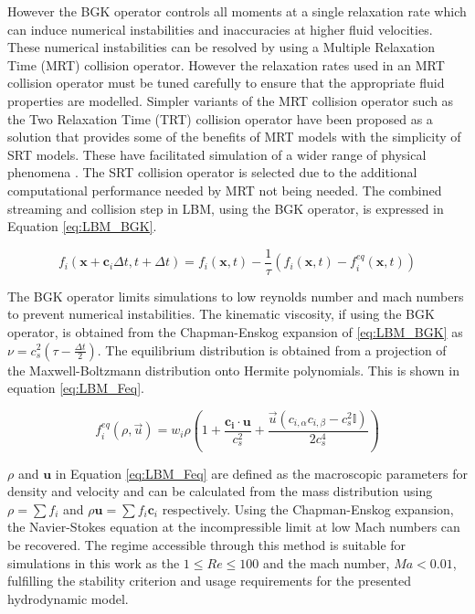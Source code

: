 However the BGK operator controls all moments at a single relaxation rate which can induce numerical instabilities and inaccuracies
at higher fluid velocities. \cite{liu_simulation_2023, adhikari_fluctuating_2005} These numerical instabilities can be resolved by using
a Multiple Relaxation Time (MRT) collision operator. However the relaxation rates used in an MRT collision operator must be tuned carefully
to ensure that the appropriate fluid properties are modelled. Simpler variants of the MRT collision operator such as the Two Relaxation Time (TRT)
collision operator have been proposed as a solution that provides some of the benefits of MRT models with the simplicity of SRT models. These 
have facilitated simulation of a wider range of physical phenomena \cite{adhikari_fluctuating_2005, liu_simulation_2023}. The SRT collision 
operator is selected due to the additional computational performance needed by MRT not being needed. The combined streaming and 
collision step in LBM, using the BGK operator, is expressed in Equation \ref{eq:LBM_BGK}.

\begin{equation}
    f_{i}(\mathbf{x} + \mathbf{c}_{i}\Delta t, t + \Delta t) = f_{i}(\mathbf{x}, t) - \frac{1}{\tau}(f_{i}(\mathbf{x}, t) 
    - f_{i}^{eq}(\mathbf{x}, t))
    \label{eq:LBM_BGK}
\end{equation}

The BGK operator limits simulations to low reynolds number and mach numbers to prevent numerical instabilities. 
\cite{qian_lattice_1992} The kinematic viscosity, if using the BGK operator, is obtained from the Chapman-Enskog expansion of \ref{eq:LBM_BGK}
as $\nu = c_s^2(\tau - \frac{\Delta t}{2})$. The equilibrium distribution is obtained from a projection of the 
Maxwell-Boltzmann distribution onto Hermite polynomials. \cite{he_theory_1997, succi_lattice_2018} This is shown in equation 
\ref{eq:LBM_Feq}.

\begin{equation}
    f_{i}^{eq}(\rho, \vec{u}) = w_i\rho(1 + \frac{\mathbf{c_i} \cdot \mathbf{u}}{c_s^2} + \frac{ \vec{u}(c_{i,\alpha}c_{i,\beta}-c_s^2\mathbb{I}) }{2c_s^4})
    \label{eq:LBM_Feq}
\end{equation}

$\rho$ and $\textbf{u}$ in Equation \ref{eq:LBM_Feq} are defined as the macroscopic parameters for density and velocity 
and can be calculated from the mass distribution using $\rho = \sum f_i$ and $\rho \mathbf{u} = \sum f_i \mathbf{c}_i$ 
respectively. Using the Chapman-Enskog expansion, the Navier-Stokes equation at the incompressible limit at low Mach
numbers can be recovered. \cite{qian_lattice_1992, he_lattice_1997} The regime accessible through this method is suitable 
for simulations in this work as the $ 1 \leq Re \leq 100 $ and the mach number, $Ma < 0.01$, fulfilling the stability 
criterion and usage requirements for the presented hydrodynamic model.

